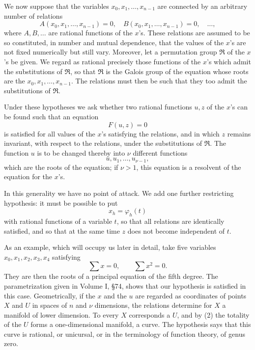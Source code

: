 \documentclass[12pt,a4paper]{article}
\begin{document}
We now suppose that the variables $x_0,x_1,
\ldots,x_{n-1}$ are connected by an arbitrary number of relations
\begin{equation}
 A(x_0,x_1,
\ldots,x_{n-1})=0,
 \quad
 B(x_0,x_1,
\ldots,x_{n-1})=0,
 \quad\ldots,
\end{equation}
where $A,B,
\ldots$ are rational functions of the $x$'s.  These relations are assumed to be so constituted, in number and mutual dependence, that the values of the $x$'s are not fixed numerically but still vary.  Moreover, let a permutation group $\mathfrak R$ of the $x$'s be given.  We regard as rational precisely those functions of the $x$'s which admit the substitutions of $\mathfrak R$, so that $\mathfrak R$ is the Galois group of the equation whose roots are the $x_0,x_1,
\ldots,x_{n-1}$.  The relations must then be such that they too admit the substitutions of $\mathfrak R$.

Under these hypotheses we ask whether two rational functions $u,z$ of the $x$'s can be found such that an equation
\begin{equation}
 F(u,z)=0
\end{equation}
is satisfied for all values of the $x$'s satisfying the relations, and in which $z$ remains invariant, with respect to the relations, under the substitutions of $\mathfrak R$.  The function $u$ is to be changed thereby into $\nu$ different functions
\[
 u,u_1,
\ldots,u_{\nu-1},
\]
which are the roots of the equation; if $\nu>1$, this equation is a resolvent of the equation for the $x$'s.

In this generality we have no point of attack.  We add one further restricting hypothesis: it must be possible to put
\begin{equation}
 x_h=\varphi_h(t)
\end{equation}
with rational functions of a variable $t$, so that all relations are identically satisfied, and so that at the same time $z$ does not become independent of $t$.

As an example, which will occupy us later in detail, take five variables $x_0,x_1,x_2,x_3,x_4$ satisfying
\begin{equation}
 \sum x=0,
 \qquad
 \sum x^2=0.
\end{equation}
They are then the roots of a principal equation of the fifth degree.  The parametrization given in Volume I, \S 74, shows that our hypothesis is satisfied in this case.  Geometrically, if the $x$ and the $u$ are regarded as coordinates of points $X$ and $U$ in spaces of $n$ and $\nu$ dimensions, the relations determine for $X$ a manifold of lower dimension.  To every $X$ corresponds a $U$, and by (2) the totality of the $U$ forms a one-dimensional manifold, a curve.  The hypothesis says that this curve is rational, or unicursal, or in the terminology of function theory, of genus zero.
\end{document}
